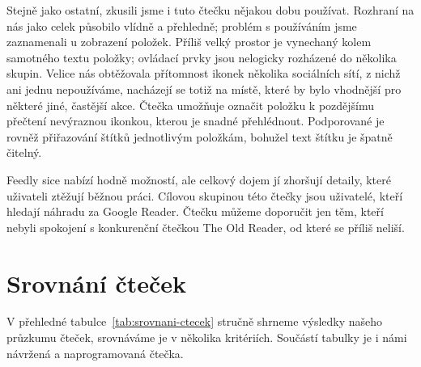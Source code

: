 Stejně jako ostatní, zkusili jsme i tuto čtečku nějakou dobu používat.
Rozhraní na nás jako celek působilo vlídně a přehledně; problém s používáním jsme zaznamenali u zobrazení položek.
Příliš velký prostor je vynechaný kolem samotného textu položky; ovládací prvky jsou nelogicky rozházené do několika skupin.
Velice nás obtěžovala přítomnost ikonek několika sociálních sítí, z nichž ani jednu nepoužíváme, nacházejí se totiž na místě, které by bylo vhodnější pro některé jiné, častější akce.
Čtečka umožňuje označit položku k pozdějšímu přečtení nevýraznou ikonkou, kterou je snadné přehlédnout.
Podporované je rovněž přiřazování štítků jednotlivým položkám, bohužel text štítku je špatně čitelný.

Feedly sice nabízí hodně možností, ale celkový dojem jí zhoršují detaily, které uživateli ztěžují běžnou práci.
Cílovou skupinou této čtečky jsou uživatelé, kteří hledají náhradu za Google Reader.
Čtečku můžeme doporučit jen těm, kteří nebyli spokojení s konkurenční čtečkou The Old Reader, od které se příliš neliší.

\section{Srovnání čteček}

V přehledné tabulce~\ref{tab:srovnani-ctecek} stručně shrneme výsledky našeho průzkumu čteček, srovnáváme je v několika kritériích.
Součástí tabulky je i námi návržená a naprogramovaná čtečka.

